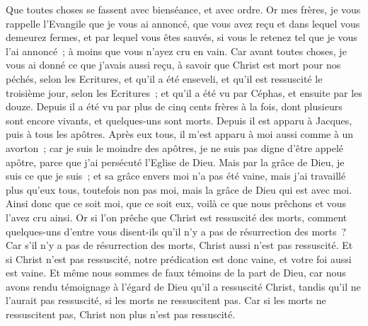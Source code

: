 \begin{multicols}{2}
Que toutes choses se fassent avec bienséance, et avec ordre.
\VerseOne{}Or mes frères, je vous rappelle l'Evangile que je vous ai annoncé, que vous avez reçu et dans lequel vous demeurez fermes,
et par lequel vous êtes sauvés, si vous le retenez tel que je vous l'ai annoncé~; à moins que vous n'ayez cru en vain.
Car avant toutes choses, je vous ai donné ce que j'avais aussi reçu, à savoir que Christ est mort pour nos péchés, selon les Ecritures,
et qu'il a été enseveli, et qu'il est ressuscité le troisième jour, selon les Ecritures~;
et qu'il a été vu par Céphas, et ensuite par les douze.
Depuis il a été vu par plus de cinq cents frères à la fois, dont plusieurs sont encore vivants, et quelques-uns sont morts.
Depuis il est apparu à Jacques, puis à tous les apôtres.
Après eux tous, il m'est apparu à moi aussi comme à un avorton~;
car je suis le moindre des apôtres, je ne suis pas digne d'être appelé apôtre, parce que j'ai persécuté l'Eglise de Dieu.
Mais par la grâce de Dieu, je suis ce que je suis~; et sa grâce envers moi n'a pas été vaine, mais j'ai travaillé plus qu'eux tous, toutefois non pas moi, mais la grâce de Dieu qui est avec moi.
Ainsi donc que ce soit moi, que ce soit eux, voilà ce que nous prêchons et vous l'avez cru ainsi.
Or si l'on prêche que Christ est ressuscité des morts, comment quelques-uns d'entre vous disent-ils qu'il n'y a pas de résurrection des morts~?
Car s'il n'y a pas de résurrection des morts, Christ aussi n'est pas ressuscité.
Et si Christ n'est pas ressuscité, notre prédication est donc vaine, et votre foi aussi est vaine.
Et même nous sommes de faux témoins de la part de Dieu, car nous avons rendu témoignage à l'égard de Dieu qu'il a ressuscité Christ, tandis qu'il ne l'aurait pas ressuscité, si les morts ne ressuscitent pas.
Car si les morts ne ressuscitent pas, Christ non plus n'est pas ressuscité.

\end{multicols}
